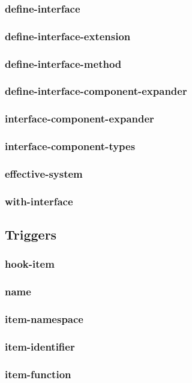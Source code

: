 \subsubsection{define-interface}
\subsubsection{define-interface-extension}
\subsubsection{define-interface-method}
\subsubsection{define-interface-component-expander}
\subsubsection{interface-component-expander}
\subsubsection{interface-component-types}
\subsubsection{effective-system}
\subsubsection{with-interface}
\newpage
\subsection{Triggers}\label{sec:lib triggers}
\subsubsection{hook-item}
\subsubsection{name}
\subsubsection{item-namespace}
\subsubsection{item-identifier}
\subsubsection{item-function}
